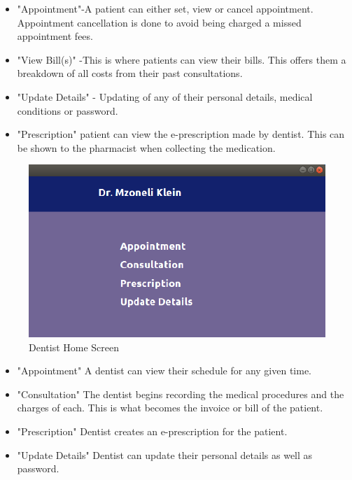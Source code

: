 \documentclass[11 pt]{article}
\begin{document}
\begin{itemize}
\item
"Appointment"-A patient can either set, view or cancel appointment. Appointment cancellation is done to avoid being charged a missed appointment fees.
\item
"View Bill(s)" -This is where patients can view their bills. This offers them a breakdown of all costs from their past consultations.
\item
"Update Details" - Updating of any of their personal details, medical conditions or password.
\item
"Prescription" patient can view the e-prescription made by dentist. This can be shown to the pharmacist when collecting the medication.
\clearpage
\end{itemize}
\begin{figure}[h]
\centering
\includegraphics[width=.7\linewidth]{dr_home.png}
\caption{Dentist Home Screen}
\label{fig:ERD}
\end{figure}
\begin{itemize}
\item
"Appointment" A dentist can view their schedule for any given time.
\item
"Consultation" The dentist begins recording the medical procedures and the charges of each. This is what becomes the invoice or bill of the patient.
\item
"Prescription" Dentist creates an e-prescription for the patient.
\item
"Update Details" Dentist can update their personal details as well as password.
\end{itemize}
\clearpage
\end{document}
